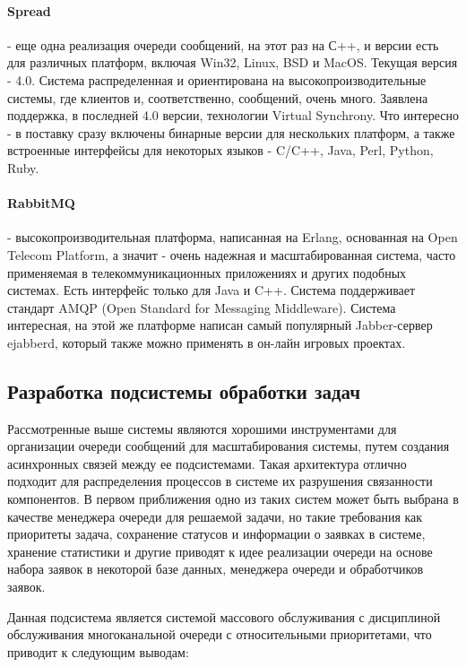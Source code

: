 \paragraph{Spread} - еще одна реализация очереди сообщений, на этот раз на С++, и версии есть для различных платформ, включая Win32, Linux, BSD и MacOS. Текущая версия - 4.0. Система распределенная и ориентирована на высокопроизводительные системы, где клиентов и, соответственно, сообщений, очень много. Заявлена поддержка, в последней 4.0 версии, технологии Virtual Synchrony. Что интересно - в поставку сразу включены бинарные версии для нескольких платформ, а также встроенные интерфейсы для некоторых языков - C/C++, Java, Perl, Python, Ruby.

\paragraph{RabbitMQ} - высокопроизводительная платформа, написанная на Erlang, основанная на Open Telecom Platform, а значит - очень надежная и масштабированная система, часто применяемая в телекоммуникационных приложениях и других подобных системах. Есть интерфейс только для Java и C++. Система поддерживает стандарт AMQP (Open Standard for Messaging Middleware). Система интересная, на этой же платформе написан самый популярный Jabber-сервер ejabberd, который также можно применять в он-лайн игровых проектах.

\subsection{Разработка подсистемы обработки задач} 
Рассмотренные выше системы являются хорошими инструментами для организации очереди сообщений для масштабирования системы, путем создания асинхронных связей между ее подсистемами. Такая архитектура отлично подходит для распределения процессов в системе их разрушения связанности компонентов. В первом приближения одно из таких систем может быть выбрана в качестве менеджера очереди для решаемой задачи, но такие требования как приоритеты задача, сохранение статусов и информации о заявках в системе, хранение статистики и другие приводят к идее реализации очереди на основе набора заявок в некоторой базе данных, менеджера очереди и обработчиков заявок.

Данная подсистема является системой массового обслуживания с дисциплиной обслуживания многоканальной очереди с относительными приоритетами, что приводит к следующим выводам:

